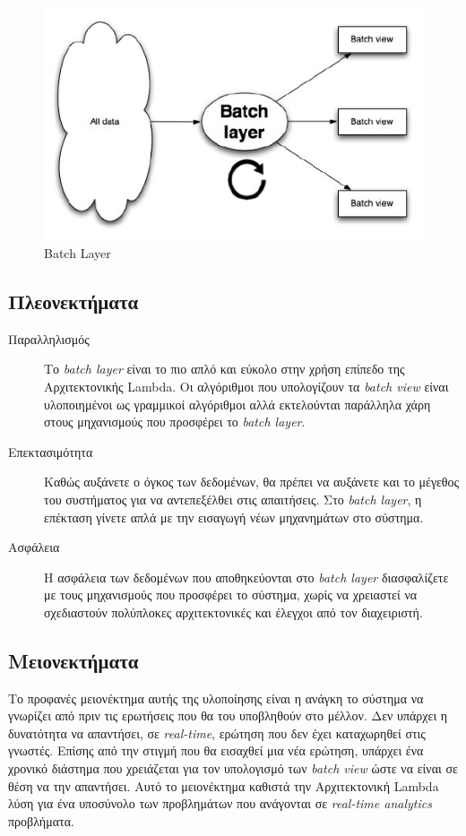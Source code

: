 \begin{figure}[t]
\caption{Batch Layer}
\includegraphics[width=12cm]{images/batch_layer.jpg}
\centering
\end{figure}
\clearpage

\subsection{Πλεονεκτήματα}
\begin{description}
\item[Παραλληλισμός] Το \textit{batch layer} είναι το πιο απλό και εύκολο στην χρήση επίπεδο της Αρχιτεκτονικής Lambda. Οι αλγόριθμοι που υπολογίζουν τα \textit{batch view} είναι υλοποιημένοι ως γραμμικοί αλγόριθμοι αλλά εκτελούνται παράλληλα χάρη στους μηχανισμούς που προσφέρει το \textit{batch layer}.
\item[Επεκτασιμότητα] Καθώς αυξάνετε ο όγκος των δεδομένων, θα πρέπει να αυξάνετε και το μέγεθος του συστήματος για να αντεπεξέλθει στις απαιτήσεις. Στο \textit{batch layer}, η επέκταση γίνετε απλά με την εισαγωγή νέων μηχανημάτων στο σύστημα.
\item[Ασφάλεια] Η ασφάλεια των δεδομένων που αποθηκεύονται στο \textit{batch layer} διασφαλίζετε με τους μηχανισμούς που προσφέρει το σύστημα, χωρίς να χρειαστεί να σχεδιαστούν πολύπλοκες αρχιτεκτονικές και έλεγχοι από τον διαχειριστή.
\end{description}


\subsection{Μειονεκτήματα}
Το προφανές μειονέκτημα αυτής της υλοποίησης είναι η ανάγκη το σύστημα να γνωρίζει από πριν τις ερωτήσεις που θα του υποβληθούν στο μέλλον. Δεν υπάρχει η δυνατότητα να απαντήσει, σε \textit{real-time}, ερώτηση που δεν έχει καταχωρηθεί στις γνωστές. Επίσης από την στιγμή που θα εισαχθεί μια νέα ερώτηση, υπάρχει ένα χρονικό διάστημα που χρειάζεται για τον υπολογισμό των \textit{batch view} ώστε να είναι σε θέση να την απαντήσει. Αυτό το μειονέκτημα καθιστά την Αρχιτεκτονική Lambda λύση για ένα υποσύνολο των προβλημάτων που ανάγονται σε \textit{real-time analytics} προβλήματα.